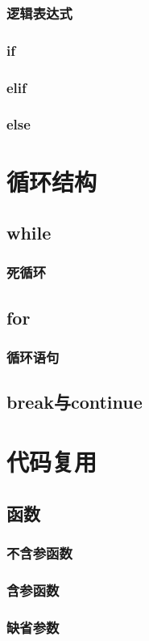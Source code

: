 \documentclass{book}
\begin{document}
\subsection{逻辑表达式}
\subsection{if}
\subsection{elif}
\subsection{else}
\chapter{循环结构}
\section{while}
\subsection{死循环}
\section{for}
\subsection{循环语句}
\section{break与continue}
\chapter{代码复用}
\section{函数}
\subsection{不含参函数}
\subsection{含参函数}
\subsection{缺省参数}
\end{document}
